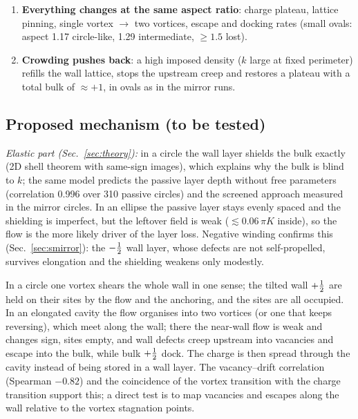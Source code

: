 \begin{enumerate}
        follow the same curve in the aspect ratio, convex or not, and a single lobe-shaped oval behaves like the lobes of a pinched one.
        \textbf{The split is geometric, not fixed by topology.}
  \item \textbf{Everything changes at the same aspect ratio}: charge plateau, lattice pinning, single vortex $\to$ two vortices, escape
        and docking rates (small ovals: aspect 1.17 circle-like, 1.29 intermediate, $\ge1.5$ lost).
  \item \textbf{Crowding pushes back}: a high imposed density ($k$ large at fixed perimeter) refills the wall lattice, stops the upstream
        creep and restores a plateau with a total bulk of $\approx+1$, in ovals as in the mirror runs.
\end{enumerate}
\subsection{Proposed mechanism (to be tested)}
\emph{Elastic part (Sec.~\ref{sec:theory}):} in a circle the wall layer shields the bulk exactly (2D shell theorem with same-sign images), which
explains why the bulk is blind to $k$; the same model predicts the passive layer depth without free parameters (correlation 0.996 over 310 passive
circles) and the screened approach measured in the mirror circles. In an ellipse the passive layer stays evenly spaced and the shielding is imperfect,
but the leftover field is weak ($\lesssim0.06\,\pi K$ inside), so the flow is the more likely driver of the layer loss. Negative winding confirms this (Sec.~\ref{sec:smirror}): the $-\tfrac12$ wall layer, whose defects are not self-propelled, survives elongation and the shielding weakens only modestly.\par

In a circle one vortex shears the whole wall in one sense; the tilted wall $+\tfrac12$ are held on their sites by the flow and the
anchoring, and the sites are all occupied. In an elongated cavity the flow organises into two vortices (or one that keeps reversing),
which meet along the wall; there the near-wall flow is weak and changes sign, sites empty, and wall defects creep upstream into
vacancies and escape into the bulk, while bulk $+\tfrac12$ dock. The charge is then spread through the cavity instead of being stored in a
wall layer. The vacancy--drift correlation (Spearman $-0.82$) and the coincidence of the vortex transition with the charge transition
support this; a direct test is to map vacancies and escapes along the wall relative to the vortex stagnation points.

